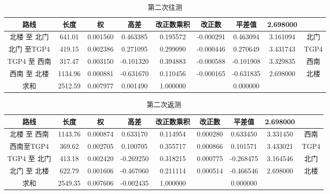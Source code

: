 \documentclass[a4paper,16pt,UTF8]{article}
\begin{document}
\begin{center}
    \setlength\tabcolsep{4pt}
    \begin{longtable}{|c|c|c|c|c|c|c|c|c|}
        \caption{第二次往测} \\ \hline
        路线    & 长度    & 权     & 高差    & 改正数乘积 & 改正数   & 平差值   & 2.698000  &  \\ \hline
        北楼 至 北门 & 641.01  & 0.001560  & 0.463385  & 0.195572  & -0.000291  & 0.463094  & 3.161094  & 北门 \\ \hline
        北门 至TGP4 & 419.15  & 0.002386  & 0.271095  & 0.299090  & -0.000446  & 0.270649  & 3.431743  & TGP4 \\ \hline
        TGP4 至 西南 & 317.47  & 0.003150  & -0.101320  & 0.394883  & -0.000588  & -0.101908  & 3.329835  & 西南 \\ \hline
        西南 至 北楼 & 1134.96  & 0.000881  & -0.631670  & 0.110456  & -0.000165  & -0.631835  & 2.698000  & 北楼 \\ \hline
        求和    & 2512.59  & 0.007977  & 0.001490  & 1.000000  &       & 0.000000  &       &  \\ \hline
    \end{longtable}

    \setlength\tabcolsep{4pt}
    \begin{longtable}{|c|c|c|c|c|c|c|c|c|}
        \caption{第二次返测} \\ \hline
        路线    & 长度    & 权     & 高差    & 改正数乘积 & 改正数   & 平差值   & 2.698000  &  \\ \hline
        北楼 至 西南 & 1143.76  & 0.000874  & 0.633170  & 0.114954  & 0.000280  & 0.633450  & 3.331450  & 西南 \\ \hline
        西南至TGP4 & 369.62  & 0.002705  & 0.100705  & 0.355717  & 0.000866  & 0.101571  & 3.433021  & TGP4 \\ \hline
        TGP4 至 北门 & 413.18  & 0.002420  & -0.269250  & 0.318215  & 0.000775  & -0.268475  & 3.164546  & 北门 \\ \hline
        北门 至 北楼 & 622.79  & 0.001606  & -0.467060  & 0.211114  & 0.000514  & -0.466546  & 2.698000  & 北楼 \\ \hline
        求和    & 2549.35  & 0.007606  & -0.002435  & 1.000000  &       & 0.000000  &       &  \\ \hline
    \end{longtable}
   

\end{center}
\end{document}
